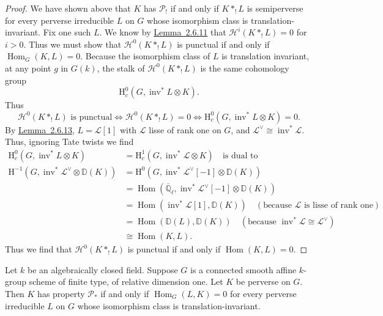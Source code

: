 \begin{proof}
We have shown above that \(K\) has \(\mathcal{P}_!\) if and only if \(K*_!L\)
is semiperverse for every perverse irreducible \(L\) on \(G\) whose isomorphism
class is translation-invariant. Fix one such \(L\). We know by \hyperref[lem:2.6.11]{Lemma~2.6.11} that
\(\mathcal{H}^i(K*_!L)=0\) for \(i>0\). Thus we must show that
\(\mathcal{H}^0(K*_!L)\) is punctual if and only if
\(\operatorname{Hom}_G(K,L)=0\). Because the isomorphism class of \(L\) is
translation invariant, at any point \(g\) in \(G(k)\), the stalk of
\(\mathcal{H}^0(K*_!L)\) is the same cohomology group
\[
  \mathrm{H}^0_c(G,\operatorname{inv}^*L\otimes K).
\]
Thus
\[
  \mathcal{H}^0(K*_!L)\text{ is punctual}
  \Longleftrightarrow
  \mathcal{H}^0(K*_!L)=0
  \Longleftrightarrow
  \mathrm{H}^0_c(G,\operatorname{inv}^*L\otimes K)=0.
\]
By \hyperref[lem:2.6.13]{Lemma~2.6.13}, \(L=\mathcal{L}[1]\) with \(\mathcal{L}\) lisse of rank one on
\(G\), and \(\mathcal{L}^{\vee}\cong\operatorname{inv}^*\mathcal{L}\). Thus,
ignoring Tate twists we find
\[
\begin{aligned}
  \mathrm{H}^0_c(G,\operatorname{inv}^*L\otimes K)
  &=
  \mathrm{H}^1_c(G,\operatorname{inv}^*\mathcal{L}\otimes K)
  \quad\text{is dual to}\\
  \mathrm{H}^{-1}(G,\operatorname{inv}^*\mathcal{L}^{\vee}\otimes\mathbb{D}(K))
  &=
  \mathrm{H}^0(G,\operatorname{inv}^*\mathcal{L}^{\vee}[-1]\otimes\mathbb{D}(K))\\
  &=
  \operatorname{Hom}(\overline{\mathbb{Q}}_\ell,
  \operatorname{inv}^*\mathcal{L}^{\vee}[-1]\otimes\mathbb{D}(K))\\
  &=
  \operatorname{Hom}(\operatorname{inv}^*\mathcal{L}[1],\mathbb{D}(K))
  \quad(\text{because }\mathcal{L}\text{ is lisse of rank one})\\
  &=
  \operatorname{Hom}(\mathbb{D}(L),\mathbb{D}(K))
  \quad(\text{because }\operatorname{inv}^*\mathcal{L}\cong\mathcal{L}^{\vee})\\
  &\cong \operatorname{Hom}(K,L).
\end{aligned}
\]
Thus we find that \(\mathcal{H}^0(K*_!L)\) is punctual if and only if
\(\operatorname{Hom}(K,L)=0\).
\end{proof}

Let \(k\) be an algebraically closed field. Suppose \(G\) is a connected smooth
affine \(k\)-group scheme of finite type, of relative dimension one. Let \(K\)
be perverse on \(G\). Then \(K\) has property \(\mathcal{P}_*\) if and only if
\(\operatorname{Hom}_G(L,K)=0\) for every perverse irreducible \(L\) on \(G\)
whose isomorphism class is translation-invariant.

